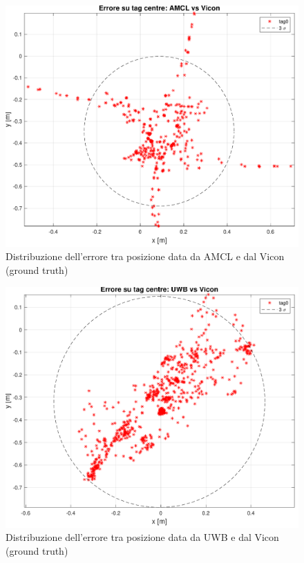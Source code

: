 \begin{figure}[] 
	\centering    
	\includegraphics[height=.3\textheight]{grafici_stanzavolo_vicon/figure19.pdf}
	\caption{Distribuzione dell'errore tra posizione data da AMCL e dal Vicon (ground truth) }
	\label{fig: err_amclvic_sphere_vicon_charlie}
\end{figure}

\begin{figure}[] 
	\centering    
	\includegraphics[height=.3\textheight]{grafici_stanzavolo_vicon/figure13.pdf}
	\caption{Distribuzione dell'errore tra posizione data da UWB e dal Vicon (ground truth)}
	\label{fig: err_uwbvic_sphere_vicon_charlie}
\end{figure}

